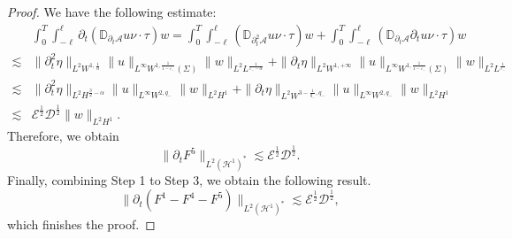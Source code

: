 \documentclass[10pt,a4paper]{amsart}
\def\p{\partial}
\begin{document}
\begin{proof}
			We have the following estimate:
			\[
			\begin{aligned}
				&\int_{0}^{T}\int_{-\ell}^{\ell} \p_{t}(\mathbb{D}_{\p_{t}\mathcal{A}}u\nu\cdot \tau)w
				=\int_{0}^{T}\int_{-\ell}^{\ell} (\mathbb{D}_{\p_{t}^{2}\mathcal{A}}u\nu\cdot \tau)w+\int_{0}^{T}\int_{-\ell}^{\ell} (\mathbb{D}_{\p_{t}\mathcal{A}}\p_{t}u\nu\cdot \tau)w\\
				\lesssim &\|\p_{t}^{2}\eta\|_{L^{2}W^{1,\frac{1}{\alpha}}}\|u\|_{L^{\infty}W^{1,\frac{1}{1-\varepsilon_{-}}}(\Sigma)}\|w\|_{L^{2}L^{\frac{1}{\varepsilon_{-}-\alpha}}}+\|\p_{t}\eta\|_{L^{2}W^{1,+\infty}}\|u\|_{L^{\infty}W^{1,\frac{1}{1-\varepsilon_{-}}}(\Sigma)}\|w \|_{L^{2}L^{\frac{1}{\varepsilon_{-}}}}\\
				\lesssim& \|\p_{t}^{2}\eta\|_{L^{2}H^{\frac{3}{2}-\alpha}}\|u\|_{L^{\infty}W^{2,q_{-}}}\|w \|_{L^{2}H^{1}}+\|\p_{t}\eta\|_{L^{2}W^{3-\frac{1}{q_{-}},q_{-}}}\|u\|_{L^{\infty}W^{2,q_{-}}}\|w\|_{L^{2}H^{1}}\\
				\lesssim& \mathscr{E}^{\frac{1}{2}}\mathscr{D}^{\frac{1}{2}}\|w\|_{L^{2}H^{1}}.
			\end{aligned}
			\]
			Therefore, we obtain
			\[
			\|\p_{t}F^{5}\|_{L^{2}(\mathcal{H}^1)^{*}}\lesssim \mathscr{E}^{\frac{1}{2}}\mathscr{D}^{\frac{1}{2}}.
			\]
			Finally, combining Step 1 to Step 3, we obtain the following result.
			\[
			\|\p_{t}(F^{1}-F^{4}-F^{5})\|_{L^{2}(\mathcal{H}^1)^{*}}\lesssim\mathscr{E}^{\frac{1}{2}}\mathscr{D}^{\frac{1}{2}},
			\]
			\noindent which finishes the proof.
		\end{proof}
\end{document}
